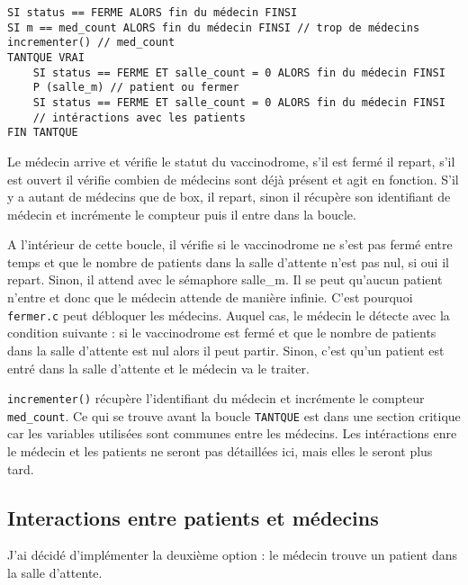 \documentclass[a4paper]{article}
\begin{document}
\begin{verbatim}
SI status == FERME ALORS fin du médecin FINSI
SI m == med_count ALORS fin du médecin FINSI // trop de médecins
incrementer() // med_count 
TANTQUE VRAI
    SI status == FERME ET salle_count = 0 ALORS fin du médecin FINSI
    P (salle_m) // patient ou fermer
    SI status == FERME ET salle_count = 0 ALORS fin du médecin FINSI
    // intéractions avec les patients
FIN TANTQUE
\end{verbatim}

Le médecin arrive et vérifie le statut du vaccinodrome, s'il est fermé il repart, s'il est ouvert il vérifie combien de médecins sont déjà présent et agit en fonction. S'il y a autant de médecins que de box, il repart, sinon il récupère son identifiant de médecin et incrémente le compteur puis il entre dans la boucle.
\medskip \par
A l'intérieur de cette boucle, il vérifie si le vaccinodrome ne s'est pas fermé entre temps et que le nombre de patients dans la salle d'attente n'est pas nul, si oui il repart. Sinon, il attend avec le sémaphore salle\_m. Il se peut qu'aucun patient n'entre et donc que le médecin attende de manière infinie. C'est pourquoi \texttt{fermer.c} peut débloquer les médecins. Auquel cas, le médecin le détecte avec la condition suivante : si le vaccinodrome est fermé et que le nombre de patients dans la salle d'attente est nul alors il peut partir.
Sinon, c'est qu'un patient est entré dans la salle d'attente et le médecin va le traiter.
\medskip \par
\texttt{incrementer()} récupère l'identifiant du médecin et incrémente le compteur \texttt{med\_count}.
Ce qui se trouve avant la boucle \texttt{TANTQUE} est dans une section critique car les variables utilisées sont communes entre les médecins.
Les intéractions enre le médecin et les patients ne seront pas détaillées ici, mais elles le seront plus tard.

\subsection{Interactions entre patients et médecins}

J'ai décidé d'implémenter la deuxième option : le médecin trouve un patient dans la salle d'attente.
\end{document}
